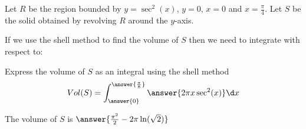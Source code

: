 \documentclass{ximera}
\author{Jason Miller}
\begin{document}
\begin{exercise}
Let $R$ be the region bounded by $y=\sec^{2}(x)$, $y=0$, $x=0$ and $x=\frac{\pi}{4}$. Let $S$ be the solid obtained by revolving $R$ around the $y$-axis. 


If we use the shell method to find the volume of $S$ then we need to integrate with respect to:

 \begin{multipleChoice}
  \end{multipleChoice}

\begin{exercise}
Express the volume of $S$ as an integral using the shell method
\[
Vol(S)=\int_{\answer{0}}^{\answer{\frac{\pi}{8}}} \answer{2\pi x \sec^{2}(x)} \d x
\]

The volume of $S$ is $\answer{  \frac{\pi^2}{2}-2\pi\ln(\sqrt{2}) }$


\end{exercise}
\end{exercise}
\end{document}

